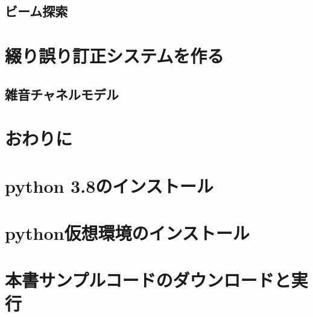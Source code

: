 \documentclass[11pt]{report}
\begin{document}
\section{ビーム探索}

\chapter{綴り誤り訂正システムを作る}

\section{雑音チャネルモデル}

\chapter{おわりに}

\appendix
\def\thesection{補遺\Alph{section}}

\chapter{python 3.8のインストール}

\chapter{python仮想環境のインストール}

\chapter{本書サンプルコードのダウンロードと実行}
\end{document}
